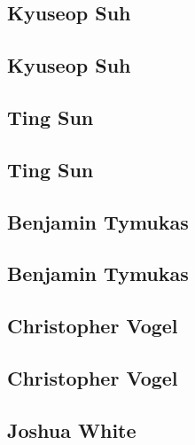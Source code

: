 \documentclass[twoside,14pt,a4paper,notitlepage]{memoir}
\begin{document}
\subsection*{Kyuseop Suh}
\label{aut:suh}

\lipsum[1-2]
\subsection*{Kyuseop Suh}
\lipsum[3]



\subsection*{Ting Sun}
\label{aut:sun}

\lipsum[1-2]
\subsection*{Ting Sun}
\lipsum[3]



\subsection*{Benjamin Tymukas}
\label{aut:tymukas}

\lipsum[1-2]
\subsection*{Benjamin Tymukas}
\lipsum[3]



\subsection*{Christopher Vogel}
\label{aut:vogel}

\lipsum[1-2]
\subsection*{Christopher Vogel}
\lipsum[3]



\subsection*{Joshua White}
\label{aut:white}
\end{document}
